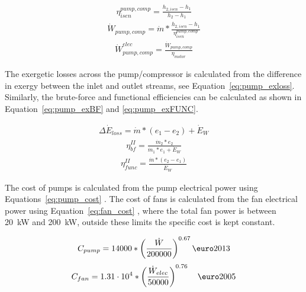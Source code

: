         \begin{align} 
            \eta_{isen}^{pump, comp} = \frac{h_{2, isen} - h_{1}}{h_{2} - h_{1}} \label{eq:pump_isen}
        \end{align}
        \begin{align} 
            \Dot{W}_{pump, comp} = \Dot{m} * \frac{h_{2, isen} - h_{1}}{\eta_{isen}^{pump, comp}} \label{eq:pump_work2}
        \end{align}
        \begin{align} 
            \Dot{W}_{pump, comp}^{elec} = \frac{\Dot{W}_{pump, comp}}{\eta_{motor}} \label{eq:pump_elec}
        \end{align}

        The exergetic losses across the pump/compressor is calculated from the difference in exergy between the inlet and outlet streams, see Equation~\ref{eq:pump_exloss}. Similarly, the brute-force and functional efficiencies can be calculated as shown in Equation~\ref{eq:pump_exBF} and \ref{eq:pump_exFUNC}.

        \begin{align}
            \Delta\Dot{E}_{loss} = \Dot{m}*(e_1 - e_2) + \Dot{E}_W \label{eq:pump_exloss}
        \end{align}
        \begin{align}
            \eta_{bf}^{II}= \frac{\Dot{m}_2*e_2}{\Dot{m}_1*e_1 + \Dot{E}_W} \label{eq:pump_exBF}
        \end{align}
        \begin{align}
            \eta_{func}^{II}= \frac{\Dot{m}*(e_2 - e_1)}{\Dot{E}_W} \label{eq:pump_exFUNC}
        \end{align}

        The cost of pumps is calculated from the pump electrical power using Equations~\ref{eq:pump_cost} \cite{Astolfi2014B}. The cost of fans is calculated from the fan electrical power using Equation~\ref{eq:fan_cost} \cite{Smith2005}, where the total fan power is between \qty{20}{\kilo\watt} and  \qty{200}{\kilo\watt}, outside these limits the specific cost is kept constant. 

        \begin{align}
            C_{pump} = 14000* \left(\frac{\Dot{W}}{200000}\right)^{0.67} \textup{\euro}2013  \label{eq:pump_cost}
        \end{align}
        \begin{align}
            C_{fan} = 1.31\cdot10^4 * \left(\frac{\Dot{W}_{elec}}{50000}\right)^{0.76} \quad  \textup{\euro}2005  \label{eq:fan_cost}
        \end{align}

